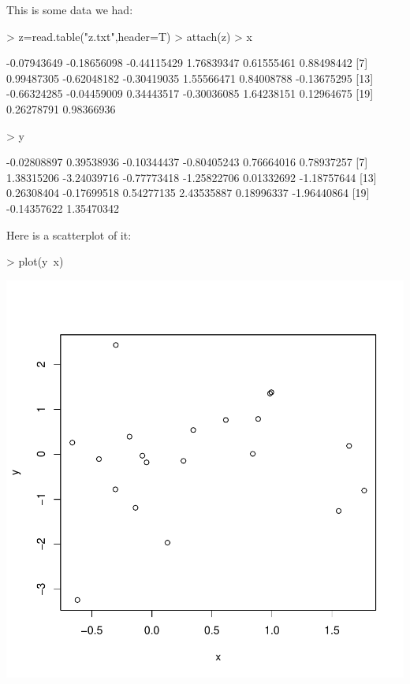 This is some data we had:

\begin{Schunk}
\begin{Sinput}
> z=read.table("z.txt",header=T)
> attach(z)
> x
\end{Sinput}
\begin{Soutput}
 [1] -0.07943649 -0.18656098 -0.44115429  1.76839347  0.61555461  0.88498442
 [7]  0.99487305 -0.62048182 -0.30419035  1.55566471  0.84008788 -0.13675295
[13] -0.66324285 -0.04459009  0.34443517 -0.30036085  1.64238151  0.12964675
[19]  0.26278791  0.98366936
\end{Soutput}
\begin{Sinput}
> y
\end{Sinput}
\begin{Soutput}
 [1] -0.02808897  0.39538936 -0.10344437 -0.80405243  0.76664016  0.78937257
 [7]  1.38315206 -3.24039716 -0.77773418 -1.25822706  0.01332692 -1.18757644
[13]  0.26308404 -0.17699518  0.54277135  2.43535887  0.18996337 -1.96440864
[19] -0.14357622  1.35470342
\end{Soutput}
\end{Schunk}


Here is a scatterplot of it:

\begin{Schunk}
\begin{Sinput}
> plot(y~x)
\end{Sinput}
\end{Schunk}
\includegraphics{second-002}
